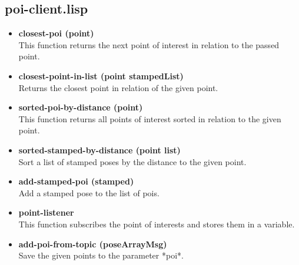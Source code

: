 \documentclass[main.tex]{subfiles}
\begin{document}
		\subsection{poi-client.lisp}
 		\begin{itemize}
	    	\item \textbf{closest-poi (point)} \\
	    	This function returns the next point of interest in relation to the passed point.
	    	\item \textbf{closest-point-in-list (point stampedList)} \\
	    	Returns the closest point in relation of the given point.
	    	\item \textbf{sorted-poi-by-distance (point)} \\
	    	This function returns all points of interest sorted in relation to the given point.
	    	\item \textbf{sorted-stamped-by-distance (point list)} \\
	    	Sort a list of stamped poses by the distance to the given point.
	    	\item \textbf{add-stamped-poi (stamped)} \\
	    	Add a stamped pose to the list of pois.
	    	\item \textbf{point-listener} \\
	    	This function subscribes the point of interests and stores them in a variable.
	    	\item \textbf{add-poi-from-topic (poseArrayMsg)} \\
	    	Save the given points to the parameter *poi*.
	    \end{itemize}
\end{document}
